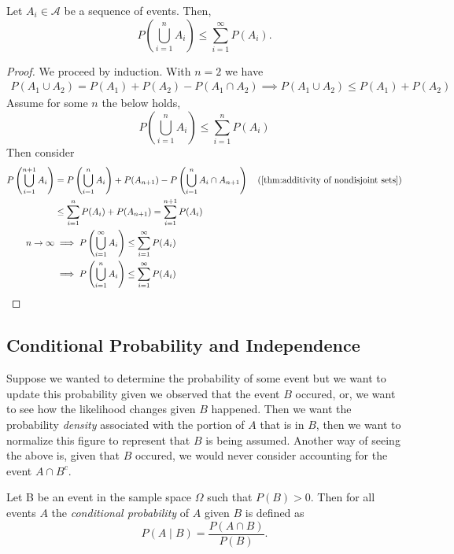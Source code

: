 \documentclass[../main.tex]{subfiles}
\begin{document}
\begin{proposition}
Let $A_i \in \mathcal{A}$ be a sequence of events. Then, 
\[
P\left(\bigcup_{i=1}^{n} A_i \right) \leq \sum_{i=1}^{\infty} P(A_i).
\]
\end{proposition}


\begin{proof}
We proceed by induction. With $n=2$ we have
\begin{gather*}
    P(A_1 \cup A_2) = P(A_1) + P(A_2) - P(A_1 \cap A_2) \implies P(A_1 \cup A_2) \leq P(A_1) + P(A_2)
\end{gather*}
Assume for some $n$ the below holds, 
\[
    P\left(\bigcup_{i=1}^{n} A_i \right) \leq \sum_{i=1}^{n} P(A_i)
\]
Then consider 
\begin{align*}
    P\left( \bigcup_{i=1}^{n+1} A_i \right) &= P\left( \bigcup_{i=1}^{n} A_i \right) + P(A_{n+1}) - P\left( \bigcup_{i=1}^{n} A_i \cap A_{n+1} \right) \quad (\ref{thm:additivity of nondisjoint sets})\\
    &\leq \sum_{i=1}^{n}{P(A_i)} + P(A_{n+1}) = \sum_{i=1}^{n+1} P(A_i)\\
    n \to \infty &\implies P\left( \bigcup_{i=1}^{\infty} A_i \right) \leq \sum_{i=1}^{\infty} P(A_i)\\
    &\implies P\left( \bigcup_{i=1}^{n} A_i \right) \leq \sum_{i=1}^{\infty} P(A_i)
\end{align*}

\end{proof}




\subsection{Conditional Probability and Independence}






\begin{remark}
Suppose we wanted to determine the probability of some event but we want to update this probability
given we observed that the event $B$ occured, or, we want to see how the likelihood changes given $B$ happened.
Then we want the probability \textit{density} associated with
the portion of $A$ that is in $B$, then we want to normalize this figure
to represent that $B$ is being assumed. Another way of seeing the above is, given that $B$ occured, we would never consider accounting for the event $A \cap B^c$.
\end{remark}

\begin{definition} \label{def: conditional_prob}
    

Let B be an event in the sample space \(\Omega\) such that \(P(B) > 0\). Then for all events \(A\) the \textit{conditional probability} of \(A\) given \(B\) is defined as
\[
P(A \mid B) = \frac{P(A \cap B)}{P(B)}.
\]

\end{definition}
\end{document}
